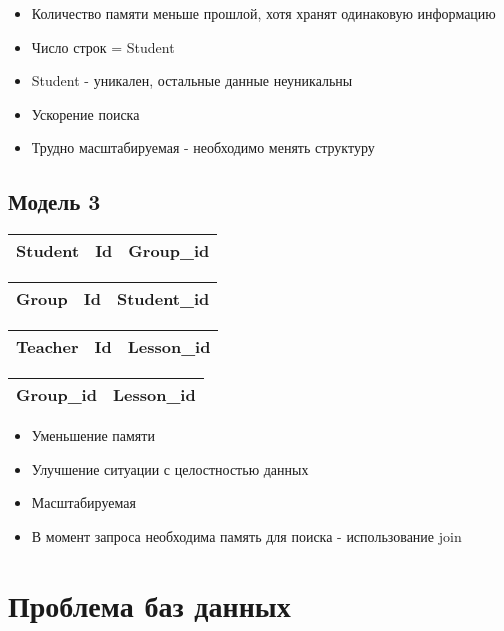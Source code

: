 \documentclass[12pt, a4paper]{article}
\begin{document}
\begin{itemize}
    \item Количество памяти меньше прошлой, хотя хранят одинаковую информацию
    \item Число строк = Student
    \item Student - уникален, остальные данные неуникальны
    \item Ускорение поиска
    \item Трудно масштабируемая - необходимо менять структуру
\end{itemize}


\subsection{Модель 3}
\begin{center}
    \begin{tabular}{|c|c|c|}
        \hline
         Student & Id & Group\_id\\
        \hline
    \end{tabular}   
    \begin{tabular}{|c|c|c|}
        \hline
         Group & Id & Student\_id \\
        \hline
    \end{tabular}    
\end{center}

\begin{center}
    \begin{tabular}{|c|c|c|}
        \hline
         Teacher & Id & Lesson\_id \\
        \hline
    \end{tabular}
    \begin{tabular}{|c|c|}
         \hline
            Group\_id & Lesson\_id\\
         \hline
    \end{tabular}
\end{center}

\begin{itemize}
    \item Уменьшение памяти
    \item Улучшение ситуации с целостностью данных
    \item Масштабируемая
    \item В момент запроса необходима память для поиска - использование join
\end{itemize}

\section{Проблема баз данных}
\end{document}
